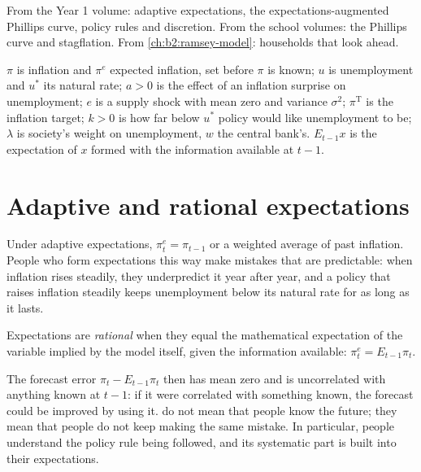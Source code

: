 \begin{recall}
From the Year 1 volume: adaptive expectations, the expectations-augmented Phillips curve, policy rules and discretion.
From the school volumes: the Phillips curve and stagflation. From \cref{ch:b2:ramsey-model}: households that look ahead.
\end{recall}

\begin{notation}\label{not:b2:expectations-and-lucas-critique:symbols}
$\pi$ is inflation and $\pi^e$ expected inflation, set before $\pi$ is known; $u$ is unemployment and $u^*$ its natural rate; $a > 0$ is the effect of an inflation
surprise on unemployment; $e$ is a supply shock with mean zero and variance $\sigma^2$; $\pi^{\mathrm T}$ is the inflation target; $k > 0$ is how far below $u^*$ policy would like
unemployment to be; $\lambda$ is society's weight on unemployment, $w$ the central bank's. $E_{t-1}x$ is the expectation of $x$ formed with the
information available at $t - 1$.
\end{notation}

\section{Adaptive and rational expectations}\label{sec:b2:expectations-and-lucas-critique:rational}

Under adaptive expectations, $\pi^e_t = \pi_{t-1}$ or a weighted average of past inflation. People who form expectations this way make
mistakes that are predictable: when inflation rises steadily, they underpredict it year after year, and a policy that
raises inflation steadily keeps unemployment below its natural rate for as long as it lasts.

\begin{definition}\label{def:b2:expectations-and-lucas-critique:rational-expectations}
Expectations are \emph{rational} when they equal the mathematical expectation of the
variable implied by the model itself, given the information available: $\pi^e_t = E_{t-1}\pi_t$.
\end{definition}

The forecast error $\pi_t - E_{t-1}\pi_t$ then has mean zero and is uncorrelated with anything known at $t - 1$: if it were correlated with something
known, the forecast could be improved by using it.  do not mean that people know the future; they mean
that people do not keep making the same mistake. In particular, people understand the policy rule being followed, and its
systematic part is built into their expectations.

